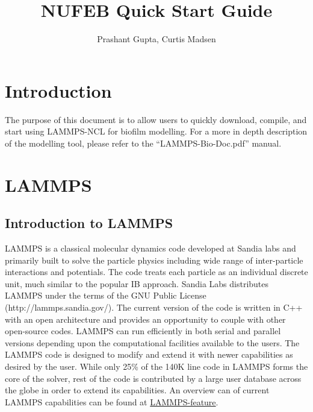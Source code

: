\documentclass[11pt,a4paper,openright]{article}
\begin{document}
%
\title{NUFEB Quick Start Guide}
\author{Prashant Gupta, Curtis Madsen}

\maketitle



\tableofcontents


\cleardoublepage
\setcounter{page}{1}


\section{Introduction}
The purpose of this document is to allow users to quickly download, compile, and start using LAMMPS-NCL for biofilm modelling.  For a more in depth description of the modelling tool, please refer to the ``LAMMPS-Bio-Doc.pdf'' manual.

\section{LAMMPS}
\subsection{Introduction to LAMMPS}
LAMMPS is a classical molecular dynamics code developed at Sandia labs and primarily built to solve the particle physics including wide range of inter-particle interactions and potentials. The code treats each particle as an individual discrete unit, much similar to the popular IB approach. Sandia Labs distributes LAMMPS under the terms of the GNU Public License (http://lammps.sandia.gov/). The current version of the code is written in C++ with an open architecture and provides an opportunity to couple with other open-source codes. LAMMPS can run efficiently in both serial and parallel versions depending upon the computational facilities available to the users.  The LAMMPS code is designed to modify and extend it with newer capabilities as desired by the user. While only 25\% of the 140K line code in LAMMPS forms the core of the solver, rest of the code is contributed by a large user database across the globe in order to extend its capabilities. An overview can of current LAMMPS capabilities can be found at \href{http://lammps.sandia.gov/features.html}{LAMMPS-feature}.
\end{document}
